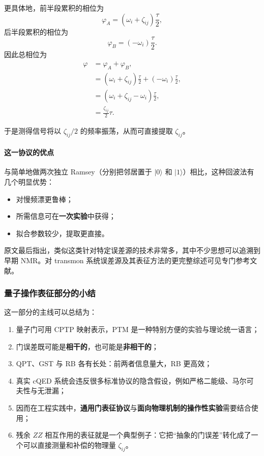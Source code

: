 \documentclass[12pt,a4paper,oneside]{ctexbook}
\begin{document}
更具体地，前半段累积的相位为
\[
\varphi_A=(\omega_i+\zeta_{ij})\frac{\tau}{2},
\]
后半段累积的相位为
\[
\varphi_B=(-\omega_i)\frac{\tau}{2}.
\]
因此总相位为
\begin{align}
\varphi
&=
\varphi_A+\varphi_B,
\tag{82}\\
&=
(\omega_i+\zeta_{ij})\frac{\tau}{2}
+
(-\omega_i)\frac{\tau}{2},
\tag{83}\\
&=
(\omega_i+\zeta_{ij}-\omega_i)\frac{\tau}{2},
\tag{84}\\
&=
\frac{\zeta_{ij}}{2}\tau.
\tag{85}
\end{align}

于是测得信号将以 \(\zeta_{ij}/2\) 的频率振荡，从而可直接提取 \(\zeta_{ij}\)。

\paragraph{这一协议的优点}
与简单地做两次独立 Ramsey（分别把邻居置于 \(|0\rangle\) 和 \(|1\rangle\)）相比，这种回波法有几个明显优势：
\begin{itemize}
    \item 对慢频漂更鲁棒；
    \item 所需信息可在\textbf{一次实验}中获得；
    \item 拟合参数较少，提取更直接。
\end{itemize}

原文最后指出，类似这类针对特定误差源的技术非常多，其中不少思想可以追溯到早期 NMR。对 transmon 系统误差源及其表征方法的更完整综述可见专门参考文献。

\subsubsection{量子操作表征部分的小结}

这一部分的主线可以总结为：

\begin{enumerate}
    \item 量子门可用 CPTP 映射表示，PTM 是一种特别方便的实验与理论统一语言；
    \item 门误差既可能是\textbf{相干的}，也可能是\textbf{非相干的}；
    \item QPT、GST 与 RB 各有长处：前两者信息量大，RB 更高效；
    \item 真实 cQED 系统会违反很多标准协议的隐含假设，例如严格二能级、马尔可夫性与无泄漏；
    \item 因而在工程实践中，\textbf{通用门表征协议}与\textbf{面向物理机制的操作性实验}需要结合使用；
    \item 残余 \(ZZ\) 相互作用的表征就是一个典型例子：它把“抽象的门误差”转化成了一个可以直接测量和补偿的物理量 \(\zeta_{ij}\)。
\end{enumerate}
\end{document}
